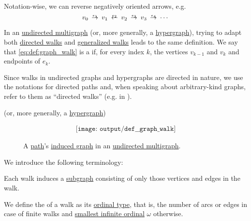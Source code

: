\begin{definition}
\begin{thmenum}[series=def:graph_walk]
    Notation-wise, we can reverse negatively oriented arrows, e.g.
    \begin{equation*}
      v_0 \reloset {e_1} \to v_1 \reloset {e_2} \leftarrow v_2 \reloset {e_3} \to v_3 \reloset {e_4} \to \cdots
    \end{equation*}

     In an \hyperref[def:hypergraph/multigraph]{undirected multigraph} (or, more generally, a \hyperref[def:hypergraph]{hypergraph}), trying to adapt both \hyperref[def:graph_walk/directed]{directed walks} and \hyperref[def:graph_walk/generalized]{generalized walks} leads to the same definition. We say that \eqref{eq:def:graph_walk} is a  if, for every index \( k \), the vertices \( v_{k-1} \) and \( v_k \) and endpoints of \( e_k \).

    Since walks in undirected graphs and hypergraphs are directed in nature, we use the notations for directed paths and, when speaking about arbitrary-kind graphs, refer to them as \enquote{directed walks} (e.g. in ).

    (or, more generally, a \hyperref[def:hypergraph]{hypergraph})
  \end{thmenum}

  \begin{figure}[!ht]
    \begin{equation}\label{eq:fig:def:graph_walk}
      \begin{aligned}
        \texttt{[image: output/def\_\_graph\_walk]}
      \end{aligned}
    \end{equation}
    \caption{A \hyperref[def:graph_walk/path]{path}'s \hyperref[def:graph_walk/subgraph]{induced graph} in an \hyperref[def:hypergraph/multigraph]{undirected multigraph}.}\label{fig:def:graph_walk}
  \end{figure}

  We introduce the following terminology:
  \begin{thmenum}[resume=def:graph_walk]
     Each walk induces a \hyperref[def:directed_multigraph/subgraph]{subgraph} consisting of only those vertices and edges in the walk.

     We define the  of a walk as its \hyperref[thm:well_ordered_order_type_existence]{ordinal type}, that is, the number of arcs or edges in case of finite walks and \hyperref[thm:omega_is_an_ordinal]{smallest infinite ordinal} \( \omega \) otherwise.


\end{thmenum}
\end{definition}
